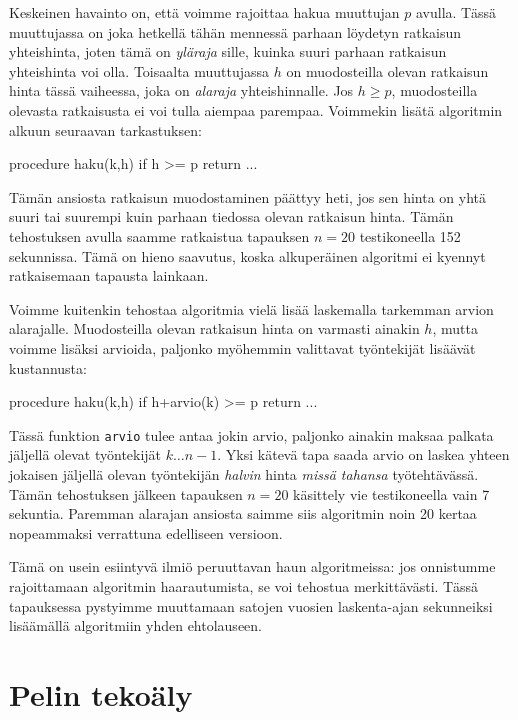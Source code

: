 Keskeinen havainto on, että voimme rajoittaa hakua muuttujan
$p$ avulla. Tässä muuttujassa on joka hetkellä
tähän mennessä parhaan löydetyn ratkaisun yhteishinta,
joten tämä on \emph{yläraja} sille, kuinka suuri parhaan ratkaisun
yhteishinta voi olla.
Toisaalta muuttujassa $h$ on muodosteilla olevan ratkaisun
hinta tässä vaiheessa, joka on \emph{alaraja} yhteishinnalle.
Jos $h \ge p$, muodosteilla olevasta ratkaisusta ei
voi tulla aiempaa parempaa. Voimmekin lisätä algoritmin alkuun
seuraavan tarkastuksen:

\begin{code}
procedure haku(k,h)
    if h >= p
        return
    ...
\end{code}

Tämän ansiosta ratkaisun muodostaminen päättyy heti,
jos sen hinta on yhtä suuri tai suurempi kuin parhaan
tiedossa olevan ratkaisun hinta.
Tämän tehostuksen avulla saamme ratkaistua tapauksen $n=20$
testikoneella 152 sekunnissa.
Tämä on hieno saavutus, koska alkuperäinen algoritmi
ei kyennyt ratkaisemaan tapausta lainkaan.

Voimme kuitenkin tehostaa algoritmia vielä lisää
laskemalla tarkemman arvion alarajalle.
Muodosteilla olevan ratkaisun hinta on varmasti ainakin $h$,
mutta voimme lisäksi arvioida, paljonko myöhemmin valittavat
työntekijät lisäävät kustannusta:

\begin{code}
procedure haku(k,h)
    if h+arvio(k) >= p
        return
    ...
\end{code}

Tässä funktion \texttt{arvio} tulee antaa jokin arvio,
paljonko ainakin maksaa palkata jäljellä olevat työntekijät $k \dots n-1$.
Yksi kätevä tapa saada arvio on laskea yhteen jokaisen jäljellä olevan
työntekijän \emph{halvin} hinta \emph{missä tahansa} työtehtävässä.
Tämän tehostuksen jälkeen tapauksen $n=20$ käsittely vie
testikoneella vain 7 sekuntia.
Paremman alarajan ansiosta saimme siis algoritmin
noin 20 kertaa nopeammaksi verrattuna edelliseen versioon.

Tämä on usein esiintyvä ilmiö peruuttavan haun algoritmeissa:
jos onnistumme rajoittamaan algoritmin
haarautumista, se voi tehostua merkittävästi.
Tässä tapauksessa pystyimme muuttamaan satojen vuosien laskenta-ajan
sekunneiksi lisäämällä algoritmiin yhden ehtolauseen.

\section{Pelin tekoäly}

